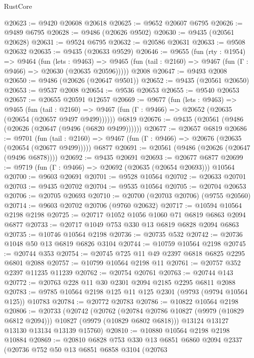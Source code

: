 \begin{lexlean}{RustCore}
\begin{coremodule}
@20623 := @9420 @20608 @20618
@20625 := @9652 @20607 @6795
@20626 := @9489 @6795
@20628 := @9486 (@20626 @9502)
@20630 := @9435 (@20561 @20628)
@20631 := @9524 @6795
@20632 := @20586 @20631
@20633 := @9508 @20632
@20635 := @9435 (@20633 @9529)
@20646 := @9655
    (fun (rty : @1954) =>
    @9464
      (fun (lets : @9463) =>
      @9465 (fun (tail : @2160) => @9467 (fun (Γ : @9466) => @20630 (@20635 @20596)))))
    @2008
@20647 := @9493 @2008
@20650 := @9486 (@20626 (@20647 @9501))
@20652 := @9435 (@20561 @20650)
@20653 := @9537 @2008
@20654 := @9536 @20653
@20655 := @9540 @20653
@20657 := @20655 @20591 @12657
@20669 := @9677
    (fun (lets : @9463) =>
    @9465
      (fun (tail : @2160) =>
      @9467 (fun (Γ : @9466) => @20652 (@20635 (@20654 (@20657 @9497 @9499))))))
    @6819
@20676 := @9435 (@20561 (@9486 (@20626 (@20647 (@9496 (@6820 @9499))))))
@20677 := @20657 @6819
@20686 := @9701
    (fun (tail : @2160) => @9467 (fun (Γ : @9466) => @20676 (@20635 (@20654 (@20677 @9499)))))
    @6877
@20691 := @20561 (@9486 (@20626 (@20647 (@9496 @6878))))
@20692 := @9435 @20691
@20693 := @20677 @6877
@20699 := @9719 (fun (Γ : @9466) => @20692 (@20635 (@20654 @20693))) @10564
@20700 := @9603 @20691
@20701 := @9528 @10564
@20702 := @20633 @20701
@20703 := @9435 @20702
@20704 := @9535 @10564
@20705 := @20704 @20653
@20706 := @20705 @20693
@20710 := @20700 (@20703 @20706) (@9755 @20560)
@20714 := @9603 @20702 @20706 (@9760 @20632)
@20717 := @10594 @10564 @2198 @2198
@20725 := @20717 @1052 @1056 @1060 @71 @6819 @6863 @2094 @6877
@20733 := @20717 @1049 @753 @330 @13 @6819 @6828 @2094 @6863
@20735 := @10746 @10564 @2198
@20736 := @20735 @532
@20742 := @20736 @1048 @50 @13 @6819 @6826 @3104
@20744 := @10759 @10564 @2198
@20745 := @20744 @353
@20754 := @20745 @725 @11 @49 @2397 @6818 @6825 @2295 @6801 @2088
@20757 := @10799 @10564 @2198 @11
@20761 := @20757 @352 @2397 @11235 @11239
@20762 := @20754 @20761
@20763 := @20744 @143
@20772 := @20763 @228 @11 @30 @2301 @2094 @2185 @2295 @6811 @2088
@20783 := @9785 @10564 @2198 @125 @11 @125 @2301 (@9793 (@9794 @10564 @125)) @10783
@20784 := @20772 @20783
@20786 := @10822 @10564 @2198
@20806 := @20733
    (@20742
      (@20762
        (@20784 @20786 @10827 (@9979 (@10829 @6812 @2094)))
        @10827
        (@9979 (@10829 @6802 @6818)))
      @13124
      @13127
      @13130
      @13134
      @13139
      @15760)
@20810 := @10880 @10564 @2198 @2198 @10884
@20869 := @20810
    @6828
    @753
    @330
    @13
    @6851
    @6860
    @2094
    @2337
    (@20736
      @752
      @50
      @13
      @6851
      @6858
      @3104
      (@20763

\end{coremodule}
\end{lexlean}
